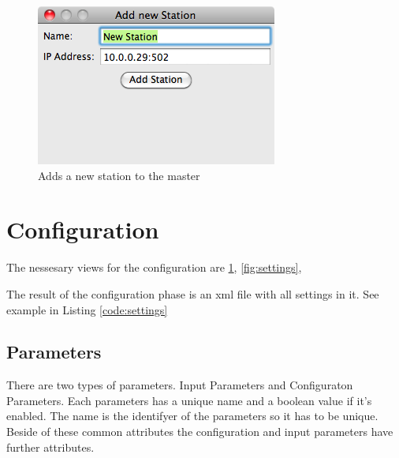 \begin{figure}[ht]
    \centering
    \includegraphics[width=0.6\linewidth]{master/add.png}
    \caption{Adds a new station to the master}
    \label{fig:add}
\end{figure}


%

\section{Configuration} %
\label{sec:configuration} 
The nessesary views for the configuration are \ref{fig:add}, \ref{fig:settings}, %

The result of the configuration phase is an xml file with all settings in it. See example in Listing \ref{code:settings}

{\C  }

\subsection{Parameters} %
\label{sub:parameters}
There are two types of parameters. Input Parameters and Configuraton Parameters. Each parameters has a unique name and a boolean value if it's enabled. The name is the identifyer of the parameters so it has to be unique. Beside of these common attributes the configuration and input parameters have further attributes.

